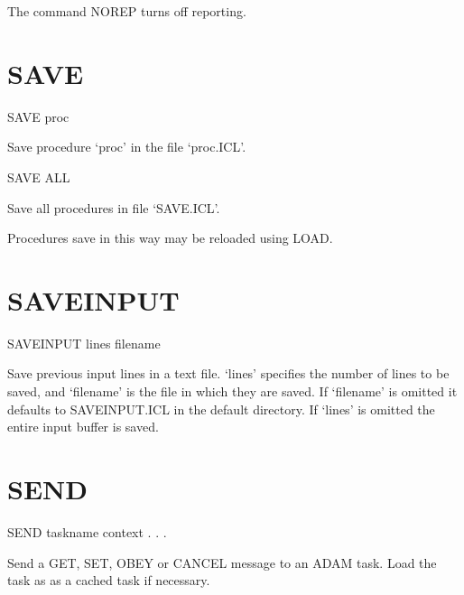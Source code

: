 \documentclass[twoside,11pt]{report}
\newcommand{\xlabel}[1]{}
\begin{document}
The command NOREP turns off reporting.


\section{\xlabel{SAVE}SAVE\label{SAVE}}

   SAVE \hspace{.5cm} proc

 Save procedure `proc' in the file `proc.ICL'. 

   SAVE  ALL

 Save all procedures in file `SAVE.ICL'.

 Procedures save in this way may be reloaded using LOAD.

\section{\xlabel{SAVEINPUT}SAVEINPUT\label{SAVEINPUT}}

   SAVEINPUT \hspace{.5cm} lines \hspace{.5cm} filename

 Save previous input lines in a text file. `lines' specifies the number of
lines to be saved, and `filename' is the file in which they are saved. If
`filename' is omitted it defaults to SAVEINPUT.ICL in the default directory.
If `lines' is omitted the entire input buffer is saved.

\section{\xlabel{SEND}SEND\label{SEND}}

    SEND \hspace{.5cm} taskname \hspace{.5cm} context \hspace{.5cm} . . . 

 Send a GET, SET, OBEY or CANCEL message to an ADAM task. Load the
 task as as a cached task if necessary.
\end{document}
